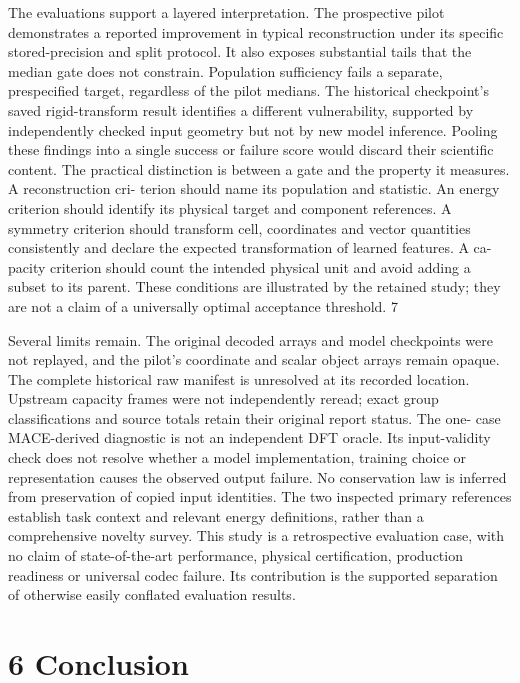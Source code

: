 \documentclass[11pt]{article}
\begin{document}
The evaluations support a layered interpretation. The prospective pilot demonstrates a reported
improvement in typical reconstruction under its specific stored-precision and split protocol. It also
exposes substantial tails that the median gate does not constrain. Population sufficiency fails a
separate, prespecified target, regardless of the pilot medians. The historical checkpoint’s saved
rigid-transform result identifies a different vulnerability, supported by independently checked input
geometry but not by new model inference. Pooling these findings into a single success or failure
score would discard their scientific content.
The practical distinction is between a gate and the property it measures. A reconstruction cri-
terion should name its population and statistic. An energy criterion should identify its physical
target and component references. A symmetry criterion should transform cell, coordinates and
vector quantities consistently and declare the expected transformation of learned features. A ca-
pacity criterion should count the intended physical unit and avoid adding a subset to its parent.
These conditions are illustrated by the retained study; they are not a claim of a universally optimal
acceptance threshold.
7

Several limits remain. The original decoded arrays and model checkpoints were not replayed,
and the pilot’s coordinate and scalar object arrays remain opaque. The complete historical raw
manifest is unresolved at its recorded location. Upstream capacity frames were not independently
reread; exact group classifications and source totals retain their original report status. The one-
case MACE-derived diagnostic is not an independent DFT oracle. Its input-validity check does
not resolve whether a model implementation, training choice or representation causes the observed
output failure. No conservation law is inferred from preservation of copied input identities.
The two inspected primary references establish task context and relevant energy definitions,
rather than a comprehensive novelty survey. This study is a retrospective evaluation case, with
no claim of state-of-the-art performance, physical certification, production readiness or universal
codec failure. Its contribution is the supported separation of otherwise easily conflated evaluation
results.

\section*{6 Conclusion}
\end{document}
